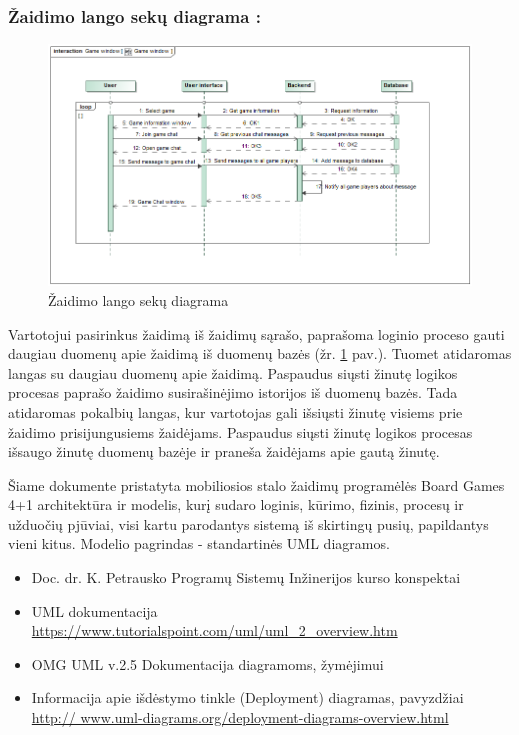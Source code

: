 \documentclass{VUMIFPSkursinis}
\begin{document}
		\subsubsection*{Žaidimo lango sekų diagrama :}
			\begin{figure}[H]
				\centering
				\includegraphics[scale=0.5]{img/GameWindow_sequence}
				\caption{Žaidimo lango sekų diagrama}
				\label{img:GameWindow_sequence}
			\end{figure}
			Vartotojui pasirinkus žaidimą iš žaidimų sąrašo, paprašoma loginio proceso
			gauti daugiau duomenų apie žaidimą iš duomenų bazės (žr. \ref{img:GameWindow_sequence} pav.). Tuomet atidaromas 
			langas su daugiau duomenų apie žaidimą. Paspaudus siųsti žinutę logikos 
			procesas paprašo žaidimo susirašinėjimo istorijos iš duomenų bazės. Tada
			atidaromas pokalbių langas, kur vartotojas gali išsiųsti žinutę visiems 
			prie žaidimo prisijungusiems žaidėjams. Paspaudus siųsti žinutę logikos 
			procesas išsaugo žinutę duomenų bazėje ir praneša žaidėjams apie gautą žinutę.
			
Šiame dokumente pristatyta mobiliosios stalo žaidimų programėlės Board Games 4+1 architektūra ir
modelis, kurį sudaro loginis, kūrimo, fizinis, procesų ir užduočių pjūviai, visi kartu parodantys
sistemą iš skirtingų pusių, papildantys vieni kitus. Modelio pagrindas - standartinės UML diagramos.
	
\begin{itemize}
	\item Doc. dr. K. Petrausko Programų Sistemų Inžinerijos kurso konspektai
	\item UML dokumentacija \url{https://www.tutorialspoint.com/uml/uml_2_overview.htm}
	\item OMG UML v.2.5 Dokumentacija diagramoms, žymėjimui
	\item Informacija apie išdėstymo tinkle (Deployment) diagramas, pavyzdžiai \url{http://	 www.uml-diagrams.org/deployment-diagrams-overview.html} 
\end{itemize}
		
\end{document}
